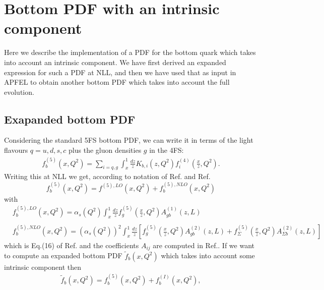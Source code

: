 \documentclass[10pt,a4paper]{article}
\begin{document}
\section*{Bottom PDF with an intrinsic component}
Here we describe the implementation of a PDF for the bottom quark which takes into account an intrinsic component.
We have first derived an expanded expression for such a PDF at NLL, and then we have used that as input in APFEL to obtain another bottom PDF which takes into account the full evolution.
\subsection*{Exapanded bottom PDF}
Considering the standard 5FS bottom PDF, we can write it in terms of the light flavours $q = u ,d, s, c $ plus the gluon densities $g$ in the 4FS:
\begin{equation}
\begin{split}
f^{\left(5\right)}_b\left(x,Q^2\right)= \sum_{i=q,g}\int_x^1\frac{dz}{z}K_{b,i}\left(z,Q^2\right)f^{\left(4\right)}_i\left(\frac{x}{z},Q^2\right).
\end{split}
\end{equation}
Writing this at NLL we get, according to notation of Ref.\cite{1} and Ref.\cite{3} 
\begin{equation}
f^{\left(5\right)}_b\left(x,Q^2\right)= f^{\left(5\right),LO}\left(x,Q^2\right) + f^{\left(5\right),NLO}_b\left(x,Q^2\right)
\end{equation}
with
\begin{equation}
\begin{split}
&f^{\left(5\right),LO}_b\left(x,Q^2\right) = \alpha_s\left(Q^2\right)\int_x^1\frac{dz}{z}f_{g}^{\left(5\right)}\left(\frac{x}{z},Q^2\right) A_{g b}^{\left(1\right)}\left(z,L\right) \\ \\
&f^{\left(5\right),NLO}_b\left(x,Q^2\right) = \left(\alpha_s\left(Q^2\right)\right)^2\int_x^1\frac{dz}{z}\left[f_g^{\left(5\right)}\left(\frac{x}{z},Q^2\right)A_{g b}^{\left(2\right)}\left(z,L\right)+f_{\Sigma}^{\left(5\right)}\left(\frac{x}{z},Q^2\right) A_{\Sigma b}^{\left(2\right)}\left(z,L\right)\right]
\end{split}
\end{equation}
which is Eq.(16) of Ref.\cite{2} and the coefficients $A_{ij} $ are computed in Ref.\cite{3}.
If we want to compute an expanded bottom PDF $\tilde{f}_b\left(x,Q^2\right) $ which takes into account some intrinsic component then
\begin{equation}
\begin{split}
\tilde{f}_b\left(x,Q^2\right)= f^{\left(5\right)}_b\left(x,Q^2\right) + f_b^{\left(I\right)}\left(x,Q^2\right),
\end{split}
\end{equation}
\end{document}
